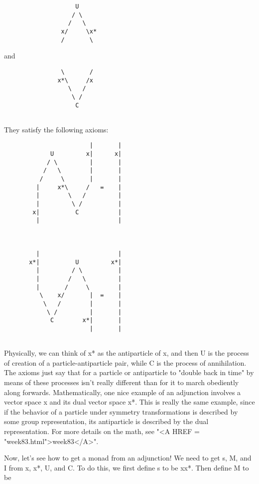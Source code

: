 \begin{verbatim}
                    U
                   / \
                  /   \
                x/     \x*
                /       \

\end{verbatim}
    
and

\begin{verbatim}
                \       /
               x*\     /x
                  \   / 
                   \ /
                    C


\end{verbatim}
    
They satisfy the following axioms:

\begin{verbatim}
                        |       |
             U         x|      x|
            / \         |       |
           /   \        |       |
          /     \       |       |
         |     x*\     /   =    | 
         |        \   /         |
         |         \ /          |
        x|          C           |
         |                      |



         |                      |
       x*|          U         x*|
         |         / \          |
         |        /   \         |
         |       /     \        |
          \    x/       |  =    | 
           \   /        |       |
            \ /         |       |
             C        x*|       |
                        |       |


\end{verbatim}
    
Physically, we can think of x* as the antiparticle of x, and then U is
the process of creation of a particle-antiparticle pair, while C is the
process of annihilation.  The axioms just say that for a particle or
antiparticle to "double back in time" by means of these processes isn't
really different than for it to march obediently along forwards. 
Mathematically, one nice example of an adjunction involves a vector
space x and its dual vector space x*.  This is really the same example,
since if the behavior of a particle under symmetry transformations is
described by some group representation, its antiparticle is described by
the dual representation.  For more details on the math, see "<A HREF = "week83.html">week83</A>".

Now, let's see how to get a monad from an adjunction!  We need to get
s, M, and I from x, x*, U, and C.  To do this, we first define s to be xx*.
Then define M to be

